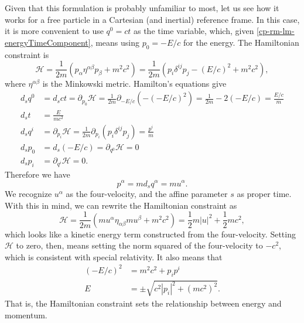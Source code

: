 Given that this formulation is probably unfamiliar to most, let us see how it works for a free particle in a Cartesian (and inertial) reference frame. In this case, it is more convenient to use $q^0=ct$ as the time variable, which, given \ref{cp-rm-lm-energyTimeComponent}, means using $p_0=-E/c$ for the energy. The Hamiltonian constraint is
\begin{equation}
	\mathcal{H} = \frac{1}{2m} \left(p_\alpha \eta^{\alpha\beta} p_\beta + m^2c^2  \right) = \frac{1}{2m} \left(p_i \delta^{ij} p_j - (E/c)^2 + m^2c^2  \right),
\end{equation}
where $\eta^{\alpha\beta}$ is the Minkowski metric. Hamilton's equations give
\begin{equation}
	\begin{aligned}
		d_s q^0 &= d_s ct = \partial_{p_0} \mathcal{H} = \frac{1}{2m}  \partial_{-E/c} (- (-E/c)^2) = \frac{1}{2m} - 2 (-E/c) = \frac{E/c}{m} \\
		d_s t &= \frac{E}{mc^2} \\
		d_s q^i &= \partial_{p_i} \mathcal{H} = \frac{1}{2m} \partial_{p_i} \left( p_i \delta^{ij} p_j \right) = \frac{p^i}{m} \\
		d_s p_0 &= d_s (-E/c) = \partial_{q^0} \mathcal{H} = 0 \\
		d_s p_i &= \partial_{q^i} \mathcal{H} = 0.
	\end{aligned}
\end{equation}
Therefore we have
\begin{equation}
	p^\alpha = m d_s q^\alpha = m u^\alpha.
\end{equation}
We recognize $u^\alpha$ as the four-velocity, and the affine parameter $s$ as proper time. With this in mind, we can rewrite the Hamiltonian constraint as
\begin{equation}
	\mathcal{H} = \frac{1}{2m} \left( mu^\alpha \eta_{\alpha\beta} mu^\beta + m^2c^2 \right) = \frac{1}{2} m |u|^2 + \frac{1}{2} m c^2,
\end{equation}
which looks like a kinetic energy term constructed from the four-velocity. Setting $\mathcal{H}$ to zero, then, means setting the norm squared of the four-velocity to $-c^2$, which is consistent with special relativity. It also means that 
\begin{equation}
	\begin{aligned}
		(-E/c)^2 &= m^2c^2 + p_i p^i \\
		E &= \pm \sqrt{c^2 |p_i|^2 + (mc^2)^2 }.
	\end{aligned}
\end{equation}
That is, the Hamiltonian constraint sets the relationship between energy and momentum.

